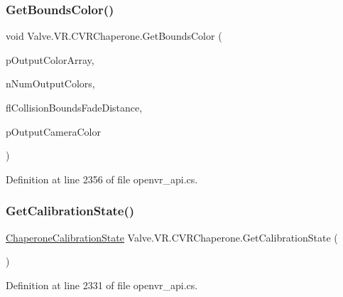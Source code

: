 \mbox{\label{class_valve_1_1_v_r_1_1_c_v_r_chaperone_a48e1cb9faace640582ef65e9e2414330}} 
\subsubsection{\texorpdfstring{GetBoundsColor()}{GetBoundsColor()}}
{\footnotesize\ttfamily void Valve.\+V\+R.\+C\+V\+R\+Chaperone.\+Get\+Bounds\+Color (\begin{DoxyParamCaption}\item[{ref \mbox{\hyperlink{struct_valve_1_1_v_r_1_1_hmd_color__t}{Hmd\+Color\+\_\+t}}}]{p\+Output\+Color\+Array,  }\item[{int}]{n\+Num\+Output\+Colors,  }\item[{float}]{fl\+Collision\+Bounds\+Fade\+Distance,  }\item[{ref \mbox{\hyperlink{struct_valve_1_1_v_r_1_1_hmd_color__t}{Hmd\+Color\+\_\+t}}}]{p\+Output\+Camera\+Color }\end{DoxyParamCaption})}



Definition at line 2356 of file openvr\+\_\+api.\+cs.

\mbox{\label{class_valve_1_1_v_r_1_1_c_v_r_chaperone_a7607e48967a20187b75d52b0b1b04070}} 
\subsubsection{\texorpdfstring{GetCalibrationState()}{GetCalibrationState()}}
{\footnotesize\ttfamily \mbox{\hyperlink{namespace_valve_1_1_v_r_ab893e8e2bf198a8cb4d2a2cd9c545c32}{Chaperone\+Calibration\+State}} Valve.\+V\+R.\+C\+V\+R\+Chaperone.\+Get\+Calibration\+State (\begin{DoxyParamCaption}{ }\end{DoxyParamCaption})}



Definition at line 2331 of file openvr\+\_\+api.\+cs.

\mbox{\label{class_valve_1_1_v_r_1_1_c_v_r_chaperone_a2cddb4abd411e2f7a63ac0312464adfc}} 
